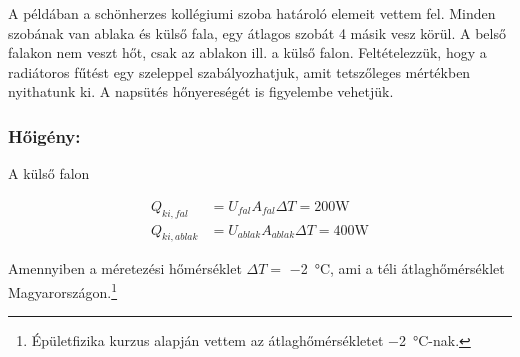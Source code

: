  A példában a schönherzes kollégiumi szoba határoló elemeit vettem fel. Minden szobának van ablaka és külső fala, egy átlagos szobát 4 másik vesz körül. A belső falakon nem veszt hőt, csak az ablakon ill. a külső falon. Feltételezzük, hogy a radiátoros fűtést egy szeleppel szabályozhatjuk, amit tetszőleges mértékben nyithatunk ki.
 A napsütés hőnyereségét is figyelembe vehetjük.%




\subsubsection*{Hőigény:}

A külső falon

\begin{equation}\label{eq_hoigeny}
\begin{aligned}
		Q_{ki,fal} &= U_{fal}A_{fal}\Delta T = 200\si{\watt}\\[10pt]
		Q_{ki,ablak} &= U_{ablak}A_{ablak}\Delta T = 400\si{\watt}
\end{aligned}
\end{equation}

Amennyiben a méretezési hőmérséklet $\Delta T=$ \SI{-2}{\celsius}, ami a téli átlaghőmérséklet Magyarországon.\footnote{Épületfizika kurzus alapján vettem az átlaghőmérsékletet \SI{-2}{\celsius}-nak.}









